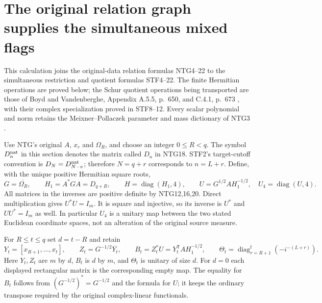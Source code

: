 \begingroup
\section{The original relation graph supplies the simultaneous mixed flags}
\label{sec:NFI}

This calculation joins the original-data relation formulas NTG4--22 to
the simultaneous restriction and quotient formulas STF4--22. The finite
Hermitian operations are proved below; the Schur quotient operations
being transported are those of Boyd and Vandenberghe,
Appendix A.5.5, p.~650, and C.4.1, p.~673
\cite{human:boyd-vandenberghe}, with their complex specialization
proved in STF8--12. Every scalar polynomial and norm retains the
Meixner--Pollaczek parameter and mass dictionary of NTG3
\cite[eqs.~(18.19.8)--(18.19.9), (18.22.8)]{human:dlmf18}.

Use NTG's original $A$, $x_r$ and $\Omega_R$, and choose an integer
$0\le R<q$. The symbol $D^{\rm nat}_n$ in this section denotes the
matrix called $D_n$ in NTG18. STF2's target-cutoff convention is
$D_N=D^{\rm nat}_{N-v}$; therefore $N=q+r$ corresponds to $n=L+r$.
Define, with the unique positive Hermitian square roots,
\[
 G=\overline{\Omega_R},\qquad H_1=A^*GA=D_{q+R},\qquad
 H=\operatorname{diag}(H_1,4),\qquad
 U=G^{1/2}AH_1^{-1/2},\quad U_4=\operatorname{diag}(U,4).
                                                               \tag{NFI1}
\]
All matrices in the inverses are positive definite by NTG12,16,20.
Direct multiplication gives $U^*U=I_m$. It is square and injective,
so its inverse is $U^*$ and $UU^*=I_m$ as well. In particular
$U_4$ is a unitary map between the two stated Euclidean coordinate
spaces, not an alteration of the original source measure.

For $R\le t\le q$ set $d=t-R$ and retain
\[
 Y_t=[x_{R+1},\ldots,x_t],\qquad
 Z_t=G^{-1/2}\overline{Y_t},\qquad
 B_t=Z_t^*U=Y_t^{\mathsf T}AH_1^{-1/2},\qquad
 \Theta_t=\operatorname{diag}_{r=R+1}^{t}(-i^{-(L+r)}).
                                                               \tag{NFI2}
\]
Here $Y_t,Z_t$ are $m$ by $d$, $B_t$ is $d$ by $m$, and
$\Theta_t$ is unitary of size $d$. For $d=0$ each displayed
rectangular matrix is the corresponding empty map. The equality
for $B_t$ follows from $(G^{-1/2})^*=G^{-1/2}$ and the formula
for $U$; it keeps the ordinary transpose required by the original
complex-linear functionals.

